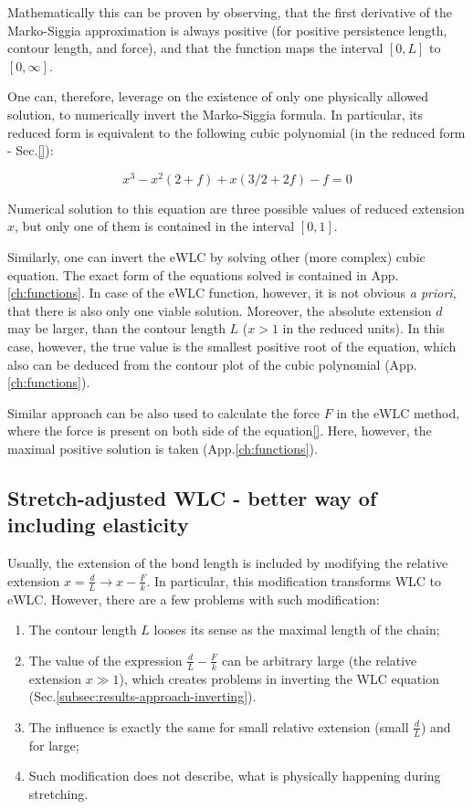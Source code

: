 Mathematically this can be proven by observing, that the first derivative of the Marko-Siggia approximation is always positive (for positive persistence length, contour length, and force), and that the function maps the interval $[0,L]$ to $[0,\infty]$.

One can, therefore, leverage on the existence of only one physically allowed solution, to numerically invert the Marko-Siggia formula.
In particular, its reduced form is equivalent to the following cubic polynomial (in the reduced form - Sec.\ref{}):

\begin{equation}
    \label{eq:results-approach-invertin}
    x^3 - x^2 (2+f) + x (3/2 + 2f) - f = 0
\end{equation}

Numerical solution to this equation are three possible values of reduced extension $x$, but only one of them is contained in the interval $[0,1]$.


Similarly, one can invert the eWLC by solving other (more complex) cubic equation.
The exact form of the equations solved is contained in App.\ref{ch:functions}.
In case of the eWLC function, however, it is not obvious \textit{a priori}, that there is also only one viable solution.
Moreover, the absolute extension $d$ may be larger, than the contour length $L$ ($x>1$ in the reduced units).
In this case, however, the true value is the smallest positive root of the equation, which also can be deduced from the contour plot of the cubic polynomial (App.\ref{ch:functions}).

Similar approach can be also used to calculate the force $F$ in the eWLC method, where the force is present on both side of the equation\ref{}.
Here, however, the maximal positive solution is taken (App.\ref{ch:functions}).

\subsection{Stretch-adjusted WLC - better way of including elasticity}
\label{subsec:results-approach-elasticity}
Usually, the extension of the bond length is included by modifying the relative extension $x=\frac{d}{L}\rightarrow x-\frac{F}{k}$.
In particular, this modification transforms WLC to eWLC\@.
However, there are a few problems with such modification:
\begin{enumerate}
    \item The contour length $L$ looses its sense as the maximal length of the chain;
    \item The value of the expression $\frac{d}{L}-\frac{F}{k}$ can be arbitrary large (the relative extension $x\gg1$), which creates problems in inverting the WLC equation (Sec.\ref{subsec:results-approach-inverting}).
    \item The influence is exactly the same for small relative extension (small $\frac{d}{L}$) and for large;
    \item Such modification does not describe, what is physically happening during stretching.
\end{enumerate}

